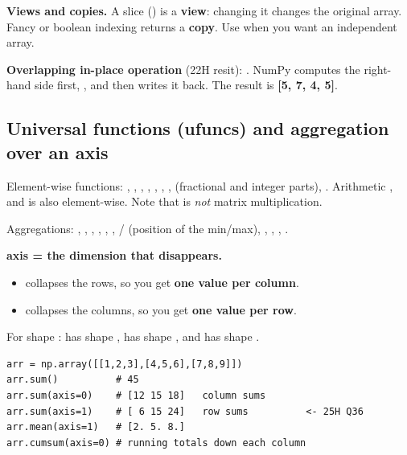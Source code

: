 \begin{idea}
\textbf{Views and copies.} A slice () is a \textbf{view}: changing it changes the original array. Fancy or boolean indexing returns a \textbf{copy}. Use  when you want an independent array.
\end{idea}

\textbf{Overlapping in-place operation} (22H resit): . NumPy computes the right-hand side first, \code{[5,2,2] + [2,2,3] = [7,4,5]}, and then writes it back. The result is \textbf{[5, 7, 4, 5]}.

\subsection{Universal functions (ufuncs) and aggregation over an axis}
Element-wise functions: , , , , , , ,  (fractional and integer parts), . Arithmetic ,  and  is also element-wise. Note that \code{*} is \emph{not} matrix multiplication.

Aggregations: , , , , , , / (position of the min/max), , , , .

\begin{idea}
\textbf{axis = the dimension that disappears.}
\begin{itemize}
  \item {} collapses the rows, so you get \textbf{one value per column}.
  \item {} collapses the columns, so you get \textbf{one value per row}.
\end{itemize}
For shape :  has shape ,  has shape , and  has shape .
\end{idea}
\begin{codebox}
\begin{Verbatim}
arr = np.array([[1,2,3],[4,5,6],[7,8,9]])
arr.sum()          # 45
arr.sum(axis=0)    # [12 15 18]   column sums
arr.sum(axis=1)    # [ 6 15 24]   row sums          <- 25H Q36
arr.mean(axis=1)   # [2. 5. 8.]
arr.cumsum(axis=0) # running totals down each column
\end{Verbatim}
\end{codebox}

